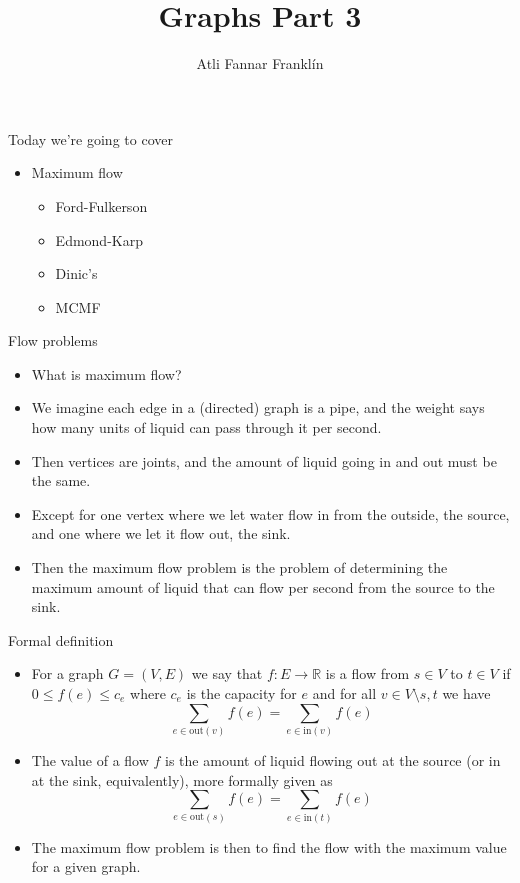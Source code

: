 \documentclass{beamer}
\title{Graphs Part 3}
\author{Atli Fannar Franklín}
\institute{\href{http://ru.is/td}{School of Computer Science} \\[2pt] \href{http://ru.is}{Reykjavík University}}
\begin{document}
	\maketitle
	
	\begin{frame}[plain]{Today we're going to cover}
		\begin{itemize}
			\item Maximum flow
			\begin{itemize}
				\item Ford-Fulkerson
				\item Edmond-Karp
				\item Dinic's
				\item MCMF
			\end{itemize}
		\end{itemize}
	\end{frame}
	
	\begin{frame}[plain]{Flow problems}
		\begin{itemize}
			\item What is maximum flow?
			\item We imagine each edge in a (directed) graph is a pipe, and the weight says how many units of liquid can pass through it per second.
			\item Then vertices are joints, and the amount of liquid going in and out must be the same.
			\item Except for one vertex where we let water flow in from the outside, the source, and one where we let it flow out, the sink.
			\item Then the maximum flow problem is the problem of determining the maximum amount of liquid that can flow per second from the source to the sink.
		\end{itemize}
	\end{frame}
	
	\begin{frame}[plain]{Formal definition}
		\begin{itemize}
			\item For a graph $G = (V, E)$ we say that $f : E \rightarrow \mathbb{R}$ is a flow from $s \in V$ to $t \in V$ if $0 \leq f(e) \leq c_e$ where $c_e$ is the capacity for $e$ and for all $v \in V \setminus{s, t}$ we have
			\[\sum_{e \in \text{out}(v)} f(e) = \sum_{e \in \text{in}(v)} f(e)\]
			\item The value of a flow $f$ is the amount of liquid flowing out at the source (or in at the sink, equivalently), more formally given as
			\[\sum_{e \in \text{out}(s)} f(e) = \sum_{e \in \text{in}(t)} f(e)\]
			\item The maximum flow problem is then to find the flow with the maximum value for a given graph.
		\end{itemize}
	\end{frame}
	
\end{document}

